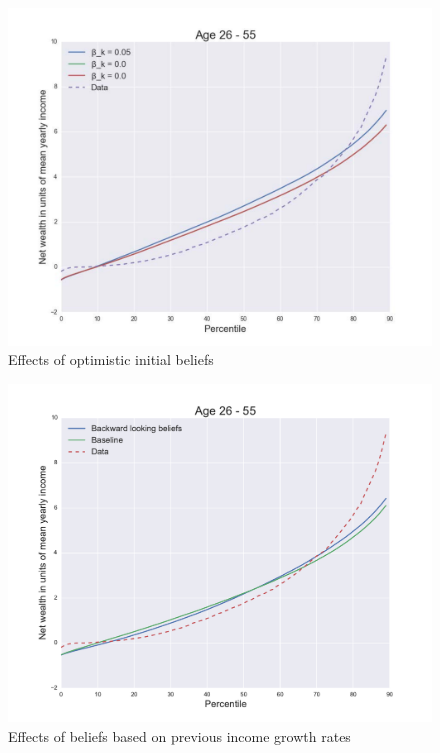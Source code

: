 \begin{figure}%
\includegraphics[width=\columnwidth]{optimisticbeta}%
\caption{Effects of optimistic initial beliefs}%
\label{fig:optimisticbeta}%
\end{figure}

\begin{figure}%
\includegraphics[width=\columnwidth]{experiment}%
\caption{Effects of beliefs based on previous income growth rates}%
\label{fig:experiment}%
\end{figure}


